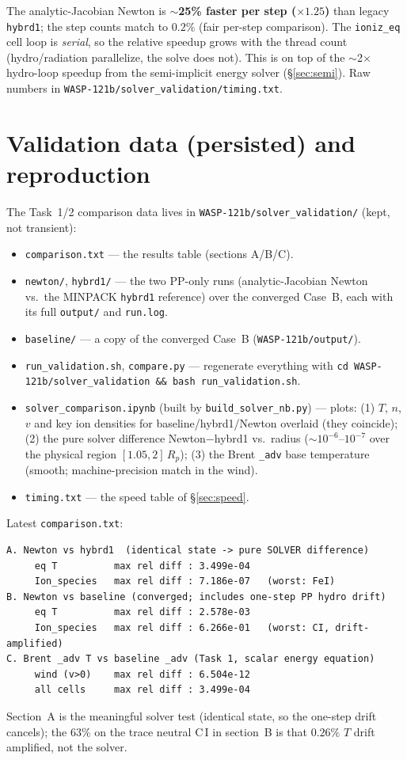 \documentclass[english,a4paper]{kiseon_memo}
\begin{document}
\noindent The analytic-Jacobian Newton is \textbf{$\sim$25\% faster per step
($\times1.25$)} than legacy \texttt{hybrd1}; the step counts match to $0.2\%$
(fair per-step comparison). The \texttt{ioniz\_eq} cell loop is \emph{serial}, so
the relative speedup grows with the thread count (hydro/radiation parallelize, the
solve does not). This is on top of the $\sim$2$\times$ hydro-loop speedup from the
semi-implicit energy solver (\S\ref{sec:semi}). Raw numbers in
\texttt{WASP-121b/solver\_validation/timing.txt}.

\section{Validation data (persisted) and reproduction}\label{sec:valdata}
The Task~1/2 comparison data lives in \texttt{WASP-121b/solver\_validation/}
(kept, not transient):
\begin{itemize}
\item \texttt{comparison.txt} --- the results table (sections A/B/C).
\item \texttt{newton/}, \texttt{hybrd1/} --- the two PP-only runs (analytic-Jacobian
  Newton vs.\ the MINPACK \texttt{hybrd1} reference) over the converged Case~B, each
  with its full \texttt{output/} and \texttt{run.log}.
\item \texttt{baseline/} --- a copy of the converged Case~B
  (\texttt{WASP-121b/output/}).
\item \texttt{run\_validation.sh}, \texttt{compare.py} --- regenerate everything
  with \texttt{cd WASP-121b/solver\_validation \&\& bash run\_validation.sh}.
\item \texttt{solver\_comparison.ipynb} (built by \texttt{build\_solver\_nb.py})
  --- plots: (1) $T$, $n$, $v$ and key ion densities for baseline/hybrd1/Newton
  overlaid (they coincide); (2) the pure solver difference Newton$-$hybrd1 vs.\
  radius ($\sim10^{-6}$--$10^{-7}$ over the physical region $[1.05,2]\,R_p$);
  (3) the Brent \texttt{\_adv} base temperature (smooth; machine-precision match in
  the wind).
\item \texttt{timing.txt} --- the speed table of \S\ref{sec:speed}.
\end{itemize}
Latest \texttt{comparison.txt}:
\begin{lstlisting}
A. Newton vs hybrd1  (identical state -> pure SOLVER difference)
     eq T          max rel diff : 3.499e-04
     Ion_species   max rel diff : 7.186e-07   (worst: FeI)
B. Newton vs baseline (converged; includes one-step PP hydro drift)
     eq T          max rel diff : 2.578e-03
     Ion_species   max rel diff : 6.266e-01   (worst: CI, drift-amplified)
C. Brent _adv T vs baseline _adv (Task 1, scalar energy equation)
     wind (v>0)    max rel diff : 6.504e-12
     all cells     max rel diff : 3.499e-04
\end{lstlisting}
Section~A is the meaningful solver test (identical state, so the one-step drift
cancels); the 63\% on the trace neutral C\,I in section~B is that $0.26\%$ $T$
drift amplified, not the solver.
\end{document}
